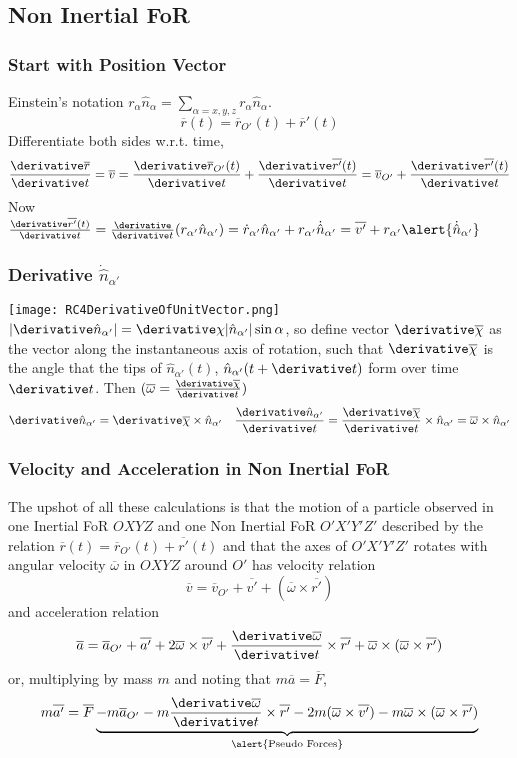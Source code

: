 \subsection{Non Inertial FoR}
\begin{frame}
\frametitle{Start with Position Vector}
\alert{Einstein's notation} $r_{\alpha}\hat{n}_{\alpha}=\sum_{\alpha=x,y,z}r_{\alpha}\hat{n}_{\alpha}$.
\[\overline{r}(t)=\overline{r}_{O'}(t)+\overline{r}'(t)\]
\alert{Differentiate} both sides w.r.t. time,
\[\frac{\derivative \overline{r}}{\derivative t}=\overline{v}=\frac{\derivative \overline{r}_{O'}(t)}{\derivative t}+\frac{\derivative\overline{r'}(t)}{\derivative t}=\overline{v}_{O'}+\frac{\derivative \overline{r'}(t)}{\derivative t}\]
Now $\frac{\derivative \overline{r'}(t)}{\derivative t}=\frac{\derivative}{\derivative t}(r_{\alpha'}\hat n_{\alpha'})=\dot r_{\alpha'}\hat{n}_{\alpha'}+r_{\alpha'}\dot{\hat{n}}_{\alpha'}=\overline{v'}+r_{\alpha'}\alert{\dot{\hat{n}}_{\alpha'}}$
\end{frame}
\begin{frame}
\frametitle{Derivative $\dot{\hat{n}}_{\alpha'}$}
\texttt{[image: RC4DerivativeOfUnitVector.png]}
$|\derivative\hat{n}_{\alpha'}|=\derivative\chi|\hat{n}_{\alpha'}|\sin\alpha$, so define vector $\derivative\overline{\chi}$ as the vector \alert{along} the instantaneous \alert{axis of rotation}, such that $\derivative\overline{\chi}$ is the \alert{angle} that the \alert{tips} of $\hat{n}_{\alpha'}(t)$, $\hat{n}_{\alpha'}(t+\derivative t)$ form over time $\derivative t$. Then $(\overline{\omega}=\frac{\derivative\overline{\chi}}{\derivative t})$
\[\derivative\hat{n}_{\alpha'}=\derivative\overline{\chi}\times\hat{n}_{\alpha'}\quad \frac{\derivative\hat{n}_{\alpha'}}{\derivative t}=\frac{\derivative\overline{\chi}}{\derivative t}\times\hat{n}_{\alpha'}=\overline{\omega}\times\hat n_{\alpha'}\]
\end{frame}
\begin{frame}
\frametitle{Velocity and Acceleration in Non Inertial FoR}
The upshot of all these calculations is that the motion of a particle observed in one \alert{Inertial FoR} $OXYZ$ and one \alert{Non Inertial FoR} $O'X'Y'Z'$ described by the relation $\overline{r}(t)=\overline{r}_{O'} (t)+\overline{r'}(t)$ and that the axes of $O'X'Y'Z'$ rotates with \alert{angular velocity} $\overline{\omega}$ in $OXYZ$ around $O'$ has \alert{velocity} relation
\[\overline{v}=\overline{v}_{O'}+\overline{v'}+(\overline{\omega}\times\overline{r'})\]
and \alert{acceleration} relation
\[\overline{a}=\overline{a}_{O'}+\overline{a'}+2\overline{\omega}\times\overline{v'}+\frac{\derivative\overline{\omega}}{\derivative t}\times\overline{r'}+\overline{\omega}\times(\overline{\omega}\times\overline{r'})\]
or, multiplying by mass $m$ and noting that $m\overline{a}=\overline{F}$,
\[
m\overline{a'}=\overline{F}\underbrace{-m\overline{a}_{O'}-m\frac{\derivative\overline{\omega}}{\derivative t}\times\overline{r'}-2m(\overline{\omega}\times\overline{v'})-m\overline{\omega}\times(\overline{\omega}\times\overline{r'})}_{\text{\alert{Pseudo Forces}}}
\]
\end{frame}
